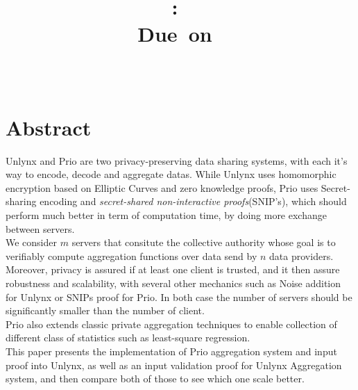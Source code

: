 \documentclass{article}
\title{
\logoepfl
\vspace{2in}
\textmd{\textbf{\hmwkClass:\ \hmwkTitle}}\\
\normalsize\vspace{0.1in}\small{Due\ on\ \hmwkDueDate}\\
\vspace{0.1in}\large{\textit{\hmwkClassInstructor\ \hmwkClassTime}}
\author{\textbf{\hmwkAuthorName}}
\vspace{3in}
}
\begin{document}
\maketitle

\newpage
\section*{Abstract}
Unlynx and Prio are two privacy-preserving data sharing systems, with each it's way to encode, decode and aggregate datas. While Unlynx uses homomorphic encryption based on Elliptic Curves and zero knowledge proofs, Prio uses Secret-sharing encoding and \textit{secret-shared non-interactive proofs}(SNIP's), which should perform much better in term of computation time, by doing more exchange between servers.\\
We consider $m$ servers that consitute the collective authority whose goal is to verifiably compute aggregation functions over data send by $n$ data providers.\\
Moreover, privacy is assured if at least one client is trusted, and it then assure  robustness and scalability,  with several other mechanics such as Noise addition for Unlynx or SNIPs proof for Prio. In both case the number of servers should be significantly smaller than the number of client.\\
Prio also extends classic private aggregation techniques to enable collection of different class of statistics such as least-square regression.\\
This paper presents the implementation of Prio aggregation system and input proof into Unlynx, as well as an input validation proof for Unlynx Aggregation system, and then compare both of those to see which one scale better.

\newpage
\tableofcontents
\newpage


\end{document}
